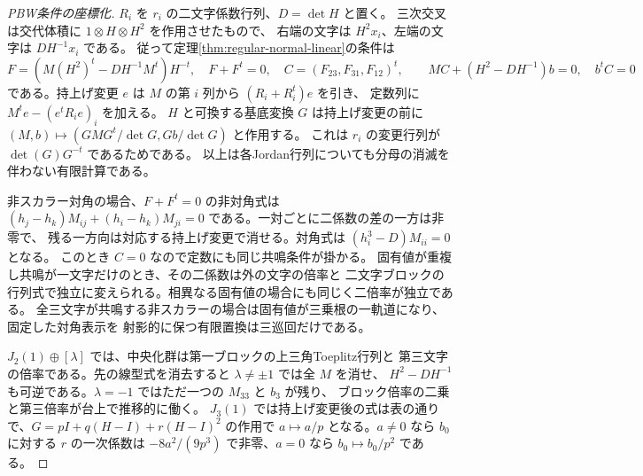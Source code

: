 \begin{proof}[PBW条件の座標化]
$R_i$ を $r_i$ の二文字係数行列、$D=\det H$ と置く。
三次交叉は交代体積に $1\otimes H\otimes H^2$ を作用させたもので、
右端の文字は $H^2x_i$、左端の文字は $DH^{-1}x_i$ である。
従って定理\ref{thm:regular-normal-linear}の条件は
\[
 F=(M(H^2)^t-DH^{-1}M^t)H^{-t},\quad F+F^t=0,\quad
 C=(F_{23},F_{31},F_{12})^t,\qquad
 MC+(H^2-DH^{-1})b=0,\quad b^t C=0
\]
である。持上げ変更 $e$ は $M$ の第 $i$ 列から $(R_i+R_i^t)e$ を引き、
定数列に $M^te-(e^tR_i e)_i$ を加える。
$H$ と可換する基底変換 $G$ は持上げ変更の前に
$(M,b)\mapsto(GMG^t/\det G,Gb/\det G)$ と作用する。
これは $r_i$ の変更行列が $\det(G)G^{-t}$ であるためである。
以上は各Jordan行列についても分母の消滅を伴わない有限計算である。

非スカラー対角の場合、$F+F^t=0$ の非対角式は
$(h_j-h_k)M_{ij}+(h_i-h_k)M_{ji}=0$ である。一対ごとに二係数の差の一方は非零で、
残る一方向は対応する持上げ変更で消せる。対角式は $(h_i^3-D)M_{ii}=0$ となる。
このとき $C=0$ なので定数にも同じ共鳴条件が掛かる。
固有値が重複し共鳴が一文字だけのとき、その二係数は外の文字の倍率と
二文字ブロックの行列式で独立に変えられる。相異なる固有値の場合にも同じく二倍率が独立である。
全三文字が共鳴する非スカラーの場合は固有値が三乗根の一軌道になり、固定した対角表示を
射影的に保つ有限置換は三巡回だけである。

$J_2(1)\oplus[\lambda]$ では、中央化群は第一ブロックの上三角Toeplitz行列と
第三文字の倍率である。先の線型式を消去すると $\lambda\ne\pm1$ では全 $M$ を消せ、
$H^2-DH^{-1}$ も可逆である。$\lambda=-1$ ではただ一つの $M_{33}$ と $b_3$ が残り、
ブロック倍率の二乗と第三倍率が台上で推移的に働く。
$J_3(1)$ では持上げ変更後の式は表の通りで、$G=pI+q(H-I)+r(H-I)^2$ の作用で
$a\mapsto a/p$ となる。$a\ne0$ なら $b_0$ に対する $r$ の一次係数は
$-8a^2/(9p^3)$ で非零、$a=0$ なら $b_0\mapsto b_0/p^2$ である。
\end{proof}

